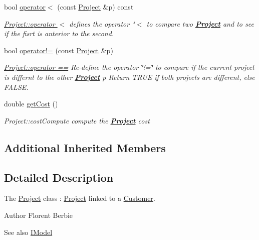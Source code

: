\begin{DoxyCompactItemize}
bool \hyperlink{classModels_1_1Project_a8e7cc264d433c708323faccae7bdd082}{operator$<$} (const \hyperlink{classModels_1_1Project}{Project} \&p) const 
\begin{DoxyCompactList}\small\item\em \hyperlink{classModels_1_1Project_a8e7cc264d433c708323faccae7bdd082}{Project\+::operator $<$} defines the operator "$<$ to compare two {\bfseries \hyperlink{classModels_1_1Project}{Project}} and to see if the fisrt is anterior to the second. \end{DoxyCompactList}\item 
bool \hyperlink{classModels_1_1Project_adf5947680a4eca62cd1cbda58a2a62f0}{operator!=} (const \hyperlink{classModels_1_1Project}{Project} \&p)
\begin{DoxyCompactList}\small\item\em \hyperlink{classModels_1_1Project_a2f322e63f6b42273c24093b9df46c2d6}{Project\+::operator ==} Re-\/define the operator \char`\"{}!=\char`\"{} to compare if the current project is differnt to the other {\bfseries \hyperlink{classModels_1_1Project}{Project}} {\itshape p} Return T\+R\+U\+E if both projects are different, else F\+A\+L\+S\+E. \end{DoxyCompactList}\item 
double \hyperlink{classModels_1_1Project_abadcaa9256589f11535114a2ab3464d6}{get\+Cost} ()
\begin{DoxyCompactList}\small\item\em Project\+::cost\+Compute compute the {\bfseries \hyperlink{classModels_1_1Project}{Project}} {\itshape cost} \end{DoxyCompactList}\end{DoxyCompactItemize}
\subsection*{Additional Inherited Members}


\subsection{Detailed Description}
The \hyperlink{classModels_1_1Project}{Project} class \+: \hyperlink{classModels_1_1Project}{Project} linked to a \hyperlink{classModels_1_1Customer}{Customer}. 

\begin{DoxyAuthor}{Author}
Florent Berbie 
\end{DoxyAuthor}
\begin{DoxySeeAlso}{See also}
\hyperlink{classModels_1_1IModel}{I\+Model} 
\end{DoxySeeAlso}


